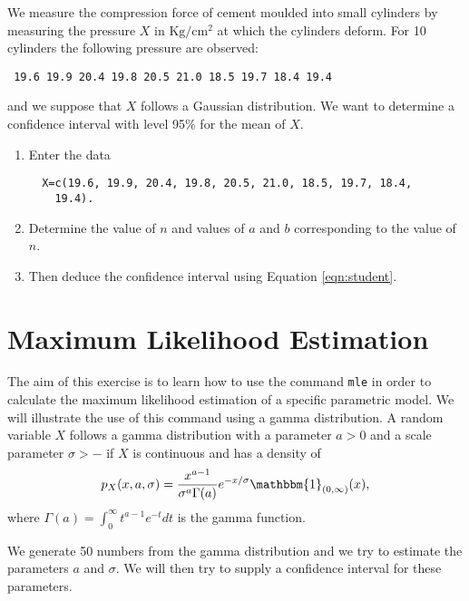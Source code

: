 \documentclass[a4paper,10pt]{article}
\begin{document}
We measure the compression force of cement moulded into small cylinders by measuring the pressure $X$ in $\mbox{Kg}/\mbox{cm}^2$ at which the cylinders deform. For 10 cylinders the following pressure are observed: 
\begin{lstlisting}
 19.6 19.9 20.4 19.8 20.5 21.0 18.5 19.7 18.4 19.4
\end{lstlisting}
and we suppose that $X$ follows a Gaussian distribution. We want to determine a confidence interval with level 95\% for the mean of $X$. 
\begin{enumerate}
 \item Enter the data 
 \begin{lstlisting} 
  X=c(19.6, 19.9, 20.4, 19.8, 20.5, 21.0, 18.5, 19.7, 18.4, 
    19.4).
 \end{lstlisting}
\item Determine the value of $n$ and values of $a$ and $b$ corresponding to the value of $n$. 
\item Then deduce the confidence interval using Equation \ref{eqn:student}. 
\end{enumerate}

\section{Maximum Likelihood Estimation} 

The aim of this exercise is to learn how to use the command \texttt{mle} in order to calculate the maximum likelihood estimation of a specific parametric model. We will illustrate the use of this command using a gamma distribution. A random variable $X$ follows a gamma distribution with a parameter $a > 0$ and a scale parameter $\sigma > -$ if $X$ is continuous and has a density of 
\begin{equation} 
 p_X(x, a, \sigma) = \frac{x^{a-1}}{\sigma^a\Gamma(a)} e^{-x/\sigma}  \mathbbm{1}_{(0, \infty)}(x), 
\end{equation}
where $\Gamma(a) = \int_0^\infty t^{a-1}e^{-t} dt$ is the gamma function. 

We generate 50 numbers from the gamma distribution and we try to estimate the parameters $a$ and $\sigma$. We will then try to supply a confidence interval for these parameters. 
\end{document}
